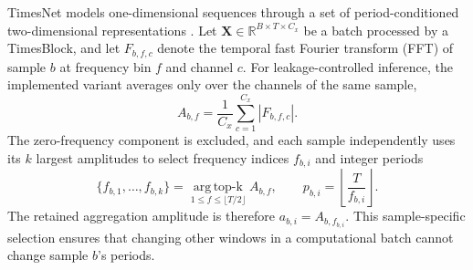 TimesNet models one-dimensional sequences through a set of
period-conditioned two-dimensional representations \cite{wu2023}. Let
$\mathbf{X}\in\mathbb{R}^{B\times T\times C_x}$ be a batch processed by a
TimesBlock, and let $F_{b,f,c}$ denote the temporal fast Fourier transform
(FFT) of sample $b$ at frequency bin $f$ and channel $c$. For
leakage-controlled inference, the implemented variant averages only over the
channels of the same sample,
\begin{equation}
  A_{b,f}
  =
  \frac{1}{C_x}
  \sum_{c=1}^{C_x}\left|F_{b,f,c}\right|.
  \label{eq:timesnet_frequency}
\end{equation}
The zero-frequency component is excluded, and each sample independently uses
its $k$ largest amplitudes to select frequency indices $f_{b,i}$ and integer
periods
\begin{equation}
  \{f_{b,1},\ldots,f_{b,k}\}
  =
  \operatorname*{arg\,top\text{-}k}_{1\leq f\leq\lfloor T/2\rfloor}
  A_{b,f},
  \qquad
  p_{b,i}=\left\lfloor\frac{T}{f_{b,i}}\right\rfloor .
  \label{eq:timesnet_periods}
\end{equation}
The retained aggregation amplitude is therefore
$a_{b,i}=A_{b,f_{b,i}}$. This sample-specific selection ensures that changing
other windows in a computational batch cannot change sample $b$'s periods.

